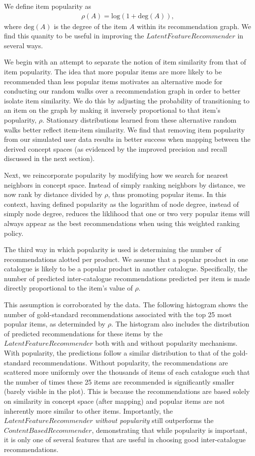 \documentclass[11pt]{article}
\begin{document}
We define item popularity as
\begin{align}
\rho(A) = \mathrm{log}(1 + \mathrm{deg}(A)),
\end{align}
where $\mathrm{deg}(A)$ is the degree of the item $A$ within its recommendation
graph.  We find this quanity to be useful in improving the
$LatentFeatureRecommender$ in several ways.

We begin with an attempt to separate the notion of item similarity from that of
item popularity. The idea that more popular items are more likely to be
recommended than less popular items motivates an alternative mode for conducting
our random walks over a recommendation graph in order to better isolate item
similarity. We do this by adjusting the probability of transitioning to an item
on the graph by making it inversely proportional to that item's popularity,
$\rho$. Stationary distributions learned from these alternative random walks
better reflect item-item similarity. We find that removing item popularity from
our simulated user data results in better success when mapping between the
derived concept spaces (as evidenced by the improved precision and recall
discussed in the next section).

Next, we reincorporate popularity by modifying how we search for nearest
neighbors in concept space. Instead of simply ranking neighbors by distance, we
now rank by distance divided by $\rho$, thus promoting popular items.  In this
context, having defined popularity as the logarithm of node degree, instead of
simply node degree, reduces the liklihood that one or two very popular items
will always appear as the best recommendations when using this weighted ranking
policy. 

The third way in which popularity is used is determining the number of
recommendations alotted per product. We assume that a popular product in one
catalogue is likely to be a popular product in another catalogue. Specifically,
the number of predicted inter-catalogue recommendations predicted per item is
made directly proportional to the item's value of $\rho$.

This assumption is corroborated by the data. The following histogram shows the
number of gold-standard recommendations associated with the top 25 most popular
items, as determinded by $\rho$. The histogram also includes the
distribution of predicted recommendations for these items by the
$LatentFeatureRecommender$ both with and without popularity mechanisms. With
popularity, the predictions follow a similar distribution to that of the
gold-standard recommendations. Without popularity, the recommendations are
scattered more uniformly over the thousands of items of each catalogue such that
the number of times these 25 items are recommended is significantly smaller
(barely visible in the plot). This is because the recommendations are based
solely on similarity in concept space (after mapping) and popular items are not
inherently more similar to other items. Importantly, the
$LatentFeatureRecommender$ {\em without popularity} still outperforms the
$ContentBasedRecommender$, demonstrating that while popularity is important, it
is only one of several features that are useful in choosing good inter-catalogue
recommendations.
\end{document}
